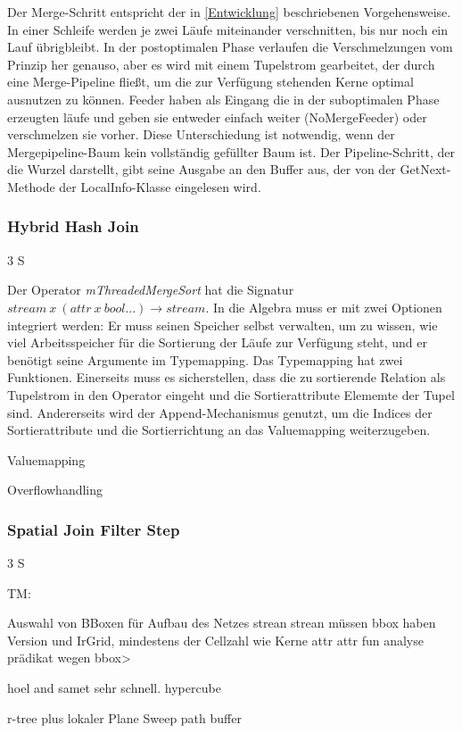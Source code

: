\documentclass[a4paper,12pt,twoside]{article}
\newcommand{\Fb}[1]{\textit{#1}} %
\begin{document}
Der Merge-Schritt entspricht der in \autoref{Entwicklung} beschriebenen Vorgehensweise. In einer Schleife werden je zwei Läufe miteinander verschnitten, bis nur noch ein Lauf übrigbleibt. In der postoptimalen Phase verlaufen die Verschmelzungen vom Prinzip her genauso, aber es wird mit einem Tupelstrom gearbeitet, der durch eine Merge-Pipeline fließt, um die zur Verfügung stehenden Kerne optimal ausnutzen zu können. Feeder haben als Eingang die in der suboptimalen Phase erzeugten läufe und geben sie entweder einfach weiter (NoMergeFeeder) oder verschmelzen sie vorher. Diese Unterschiedung ist notwendig, wenn der Mergepipeline-Baum kein vollständig gefüllter Baum ist. Der Pipeline-Schritt, der die Wurzel darstellt, gibt seine Ausgabe an den Buffer aus, der von der GetNext-Methode der LocalInfo-Klasse eingelesen wird. 


\subsubsection{Hybrid Hash Join} 3 S

Der Operator \Fb{mThreadedMergeSort} hat die Signatur $stream~x~(attr~x~bool \ldots) \longrightarrow stream$. In die Algebra muss er mit zwei Optionen integriert werden: Er muss seinen Speicher selbst verwalten, um zu wissen, wie viel Arbeitsspeicher für die Sortierung der Läufe zur Verfügung steht, und er benötigt seine Argumente im Typemapping. Das Typemapping hat zwei Funktionen. Einerseits muss es sicherstellen, dass die zu sortierende Relation als Tupelstrom in den Operator eingeht und die Sortierattribute Elememte der Tupel sind. Andererseits wird der Append-Mechanismus genutzt, um die Indices der Sortierattribute und die Sortierrichtung an das Valuemapping weiterzugeben.

Valuemapping


Overflowhandling

\subsubsection{Spatial Join Filter Step} 3 S




TM:

Auswahl von BBoxen für Aufbau des Netzes
strean strean müssen bbox haben Version und IrGrid, mindestens der Cellzahl wie Kerne
attr attr fun
analyse prädikat wegen bbox>

hoel and samet sehr schnell. hypercube

r-tree plus lokaler Plane Sweep
path buffer
\end{document}

